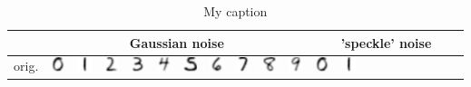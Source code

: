 \documentclass[a4paper,english]{article}
\begin{document}
\begin{table}[]
\centering
\caption{My caption}
\label{my-label}
\begin{tabular}{r|llllllllll|llllllllll|}
\cline{2-21}
                             & \multicolumn{10}{c|}{Gaussian noise}  & \multicolumn{10}{c|}{'speckle' noise} \\ \hline
\multicolumn{1}{|r|}{orig.}  & \includegraphics[height=0.4cm]{denoised_usps/9/original_clean.png} 
							& \includegraphics[height=0.4cm]{denoised_usps/0/original_clean.png} 
							& \includegraphics[height=0.4cm]{denoised_usps/1/original_clean.png} 
							& \includegraphics[height=0.4cm]{denoised_usps/2/original_clean.png} 
							& \includegraphics[height=0.4cm]{denoised_usps/3/original_clean.png} 
							& \includegraphics[height=0.4cm]{denoised_usps/4/original_clean.png} 
							& \includegraphics[height=0.4cm]{denoised_usps/5/original_clean.png} 
							& \includegraphics[height=0.4cm]{denoised_usps/6/original_clean.png} 
							& \includegraphics[height=0.4cm]{denoised_usps/7/original_clean.png} 
							& \includegraphics[height=0.4cm]{denoised_usps/8/original_clean.png} 
							& \includegraphics[height=0.4cm]{denoised_usps/9/original_clean.png} 
							& \includegraphics[height=0.4cm]{denoised_usps/0/original_clean.png} 

\end{tabular}
\end{table}
\end{document}
